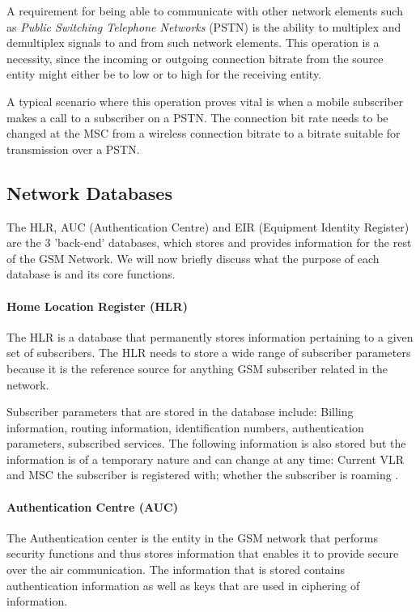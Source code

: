 A requirement for being able to communicate with other network elements such as \emph{Public Switching Telephone Networks} (PSTN) is the ability to multiplex and demultiplex signals to and from such network elements. This operation is a necessity, since the incoming or outgoing connection bitrate from the source entity might either be to low or to high for the receiving entity.

A typical scenario where this operation proves vital is when a mobile subscriber makes a call to a subscriber on a PSTN. The connection bit rate needs to be changed at the MSC from a wireless connection bitrate to a bitrate suitable for transmission over a PSTN.

\subsection{Network Databases}
The HLR, AUC (Authentication Centre) and EIR (Equipment Identity Register) are the 3 'back-end' databases, which stores and provides information for the rest of the GSM Network. We will now briefly discuss what the purpose of each database is and its core functions.

\paragraph{Home Location Register (HLR)}
The HLR is a database that permanently stores information pertaining to a given set of subscribers. The HLR needs to store a wide range of subscriber parameters because it is the reference source for anything GSM subscriber related in the network. 

Subscriber parameters that are stored in the database include: Billing information, routing information, identification numbers, authentication parameters, subscribed services. The following information is also stored but the information is of a temporary nature and can change at any time: Current VLR and MSC the subscriber is registered with; whether the subscriber is roaming \cite{GSMSysEngin}.

\paragraph{Authentication Centre (AUC)}
The Authentication center is the entity in the GSM network that performs security functions and thus stores information that enables it to provide secure over the air communication\cite{GSM92,GSMSysEngin}. The information that is stored contains authentication information as well as keys that are used in ciphering of information\cite{GSM92,GSMSysEngin}.

